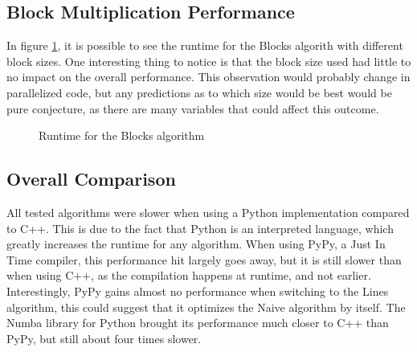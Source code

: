 \documentclass[sigconf,balance,nonacm]{acmart}
\begin{document}
\subsection{Block Multiplication Performance}
\label{sub:block}

In figure \ref{fig:blocks}, it is possible to see the runtime for the Blocks algorith with different block sizes.
One interesting thing to notice is that the block size used had little to no impact on the overall performance.
This observation would probably change in parallelized code, but any predictions as to which size would be best would be pure conjecture, as there are many variables that could affect this outcome.

\begin{figure}[H]
    \centering
    \caption{Runtime for the Blocks algorithm}
    \label{fig:blocks}
\end{figure}

\subsection{Overall Comparison}
\label{sub:overall}

All tested algorithms were slower when using a Python implementation compared to C++.
This is due to the fact that Python is an interpreted language, which greatly increases the runtime for any algorithm.
When using PyPy, a Just In Time compiler, this performance hit largely goes away, but it is still slower than when using C++, as the compilation happens at runtime, and not earlier.
Interestingly, PyPy gains almost no performance when switching to the Lines algorithm, this could suggest that it optimizes the Naive algorithm by itself.
The Numba library for Python brought its performance much closer to C++ than PyPy, but still about four times slower.
\end{document}
